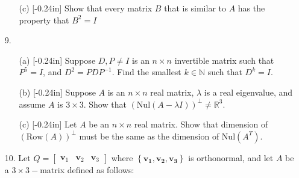 \documentclass[letterpaper,12pt]{article}
\newcommand{\set}[1]{\left\{ #1 \right\}}
\theoremstyle{definition}
\begin{document}
\newpage
\begin{enumerate}
    \item[] \begin{enumerate}
        \item[(c)]\reversemarginpar{}[-0.24in] Show that every matrix $B$ that is similar to $A$ has the property that $B^2 = I$
    \end{enumerate}
\end{enumerate}
\newpage
\begin{enumerate}
    \item[9.] \begin{enumerate}
        \item[(a)]\reversemarginpar{}[-0.24in] Suppose $D,P\neq I$ is an $n\times n$ invertible  matrix such that $P^5 = I$, and $D^2 = PDP^{-1}$. Find the smallest $k \in \mathbb{N}$ such that $D^k = I$.
    \end{enumerate}
\end{enumerate}
\newpage
\begin{enumerate}
    \item[] \begin{enumerate}
        \item[(b)]\reversemarginpar{}[-0.24in] Suppose $A$ is an $n\times n$ real matrix, $\lambda$ is a real eigenvalue, and assume $A$ is $3\times 3$. Show that $(\mathrm{Nul}(A-\lambda I))^\perp \neq \mathbb{R}^3$.
    \end{enumerate}
\end{enumerate}
\newpage
\begin{enumerate}
    \item[] \begin{enumerate}
        \item[(c)]\reversemarginpar{}[-0.24in] Let $A$ be an $n\times n$ real matrix. Show that dimension of $(\mathrm{Row}(A))^\perp$ must be the same as 
        the dimension of $\mathrm{Nul}(A^T)$. 
    \end{enumerate}
\end{enumerate}
\newpage
\begin{enumerate}
    \item[10.] Let $Q = \begin{bmatrix}
        \mathbf{v}_1 & \mathbf{v}_2 & \mathbf{v}_3 
    \end{bmatrix}$ where $\set{\mathbf{v_1},\mathbf{v_2},\mathbf{v_3}}$ is orthonormal, and let $A$ be a $3\times3-$matrix defined as follows: 
\end{enumerate}
\end{document}
